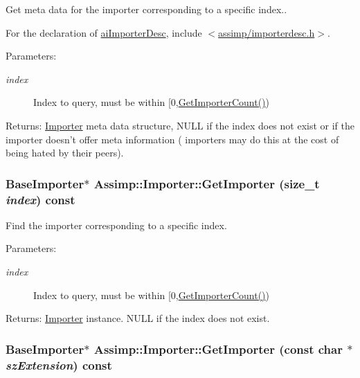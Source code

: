 Get meta data for the importer corresponding to a specific index..

For the declaration of \hyperlink{structai_importer_desc}{aiImporterDesc}, include $<$\hyperlink{importerdesc_8h}{assimp/importerdesc.h}$>$. \begin{Desc}
\item[Parameters:]
\begin{description}
\item[{\em index}]Index to query, must be within \mbox{[}0,\hyperlink{class_assimp_1_1_importer_fe982451f1a1c9b0b59c788f9329ccc1}{GetImporterCount()}) \end{description}
\end{Desc}
\begin{Desc}
\item[Returns:]\hyperlink{class_assimp_1_1_importer}{Importer} meta data structure, NULL if the index does not exist or if the importer doesn't offer meta information ( importers may do this at the cost of being hated by their peers). \end{Desc}
\hypertarget{class_assimp_1_1_importer_712a0545a11c9d198392867552ba6646}{
\subsubsection[GetImporter]{\setlength{\rightskip}{0pt plus 5cm}BaseImporter$\ast$ Assimp::Importer::GetImporter (size\_\-t {\em index}) const}}
\label{class_assimp_1_1_importer_712a0545a11c9d198392867552ba6646}


Find the importer corresponding to a specific index.

\begin{Desc}
\item[Parameters:]
\begin{description}
\item[{\em index}]Index to query, must be within \mbox{[}0,\hyperlink{class_assimp_1_1_importer_fe982451f1a1c9b0b59c788f9329ccc1}{GetImporterCount()}) \end{description}
\end{Desc}
\begin{Desc}
\item[Returns:]\hyperlink{class_assimp_1_1_importer}{Importer} instance. NULL if the index does not exist. \end{Desc}
\hypertarget{class_assimp_1_1_importer_18921ab411273fa95961f60848ad6007}{
\subsubsection[GetImporter]{\setlength{\rightskip}{0pt plus 5cm}BaseImporter$\ast$ Assimp::Importer::GetImporter (const char $\ast$ {\em szExtension}) const}}
\label{class_assimp_1_1_importer_18921ab411273fa95961f60848ad6007}


